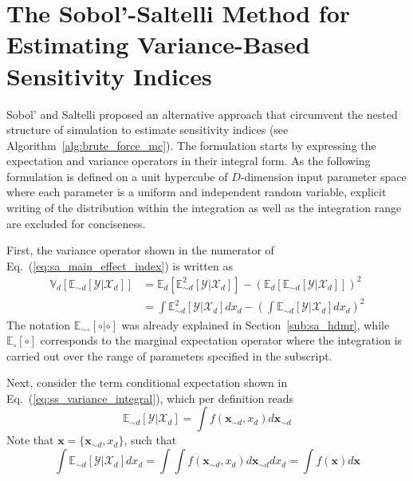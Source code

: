 \section{The Sobol'-Saltelli Method for Estimating Variance-Based Sensitivity Indices}\label{app:sobol_saltelli}

Sobol' \cite{Sobol2001} and Saltelli \cite{Saltelli2002} proposed an alternative approach that circumvent the nested structure of  simulation to estimate sensitivity indices (see Algorithm~\ref{alg:brute_force_mc}).
The formulation starts by expressing the expectation and variance operators in their integral form.
As the following formulation is defined on a unit hypercube of $D$-dimension input parameter space where each parameter is a uniform and independent random variable,
explicit writing of the distribution within the integration as well as the integration range are excluded for conciseness.

First, the variance operator shown in the numerator of Eq.~(\ref{eq:sa_main_effect_index}) is written as
\begin{equation}
  \begin{split}
    \mathbb{V}_{d}[\mathbb{E}_{\sim d}[\mathcal{Y}|\mathcal{X}_d]] & = \mathbb{E}_{d}[\mathbb{E}_{\sim d}^{2}[\mathcal{Y}|\mathcal{X}_d]] - \left(\mathbb{E}_{d}[\mathbb{E}_{\sim d}[\mathcal{Y}|\mathcal{X}_d]]\right)^2 \\ 
                                               & = \int \mathbb{E}_{\sim d}^{2}[\mathcal{Y}|\mathcal{X}_d] dx_d - \left(\int \mathbb{E}_{\sim d}[\mathcal{Y}|\mathcal{X}_d] dx_d\right)^2
  \end{split}
\label{eq:ss_variance_integral}
\end{equation}
The notation $\mathbb{E}_{\sim \circ}[\circ | \circ]$ was already explained in Section~\ref{sub:sa_hdmr}, 
while $\mathbb{E}_{\circ} [\circ]$ corresponds to the marginal expectation operator 
where the integration is carried out over the range of parameters specified in the subscript. 

Next, consider the term conditional expectation shown in Eq.~(\ref{eq:ss_variance_integral}), which per definition reads
\begin{equation}
  \mathbb{E}_{\sim d} [\mathcal{Y}|\mathcal{X}_d] = \int f(\bm{x}_{\sim d}, x_d) d\bm{x}_{\sim d}
\label{eq:ss_expectation_integral}
\end{equation}
Note that $\bm{x} = \{\bm{x}_{\sim d}, x_d\}$, such that
\begin{equation}
  \int \mathbb{E}_{\sim d} [\mathcal{Y}|\mathcal{X}_d] dx_d = \int \int f(\bm{x}_{\sim d}, x_d) d\bm{x}_{\sim d} dx_{d} = \int f(\bm{x}) d\bm{x}
\label{eq:ss_expectation_expectation}
\end{equation}

